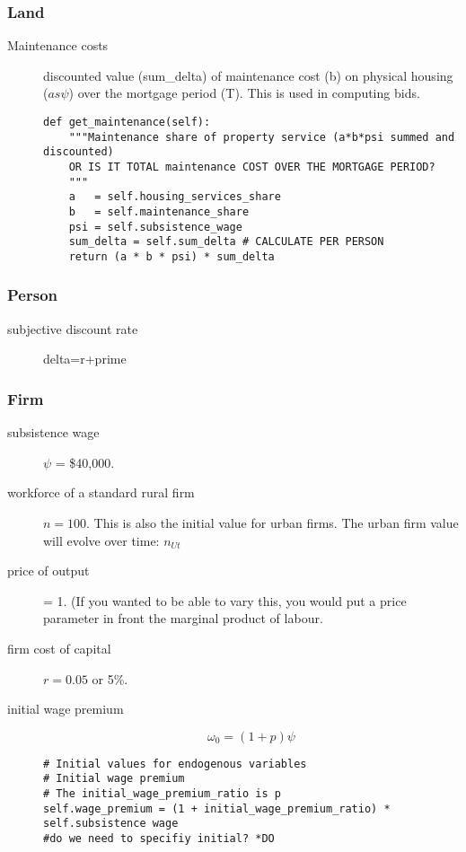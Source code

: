 \subsubsection{Land}
\begin{description}
\item[Maintenance costs] discounted value (sum\_delta) of maintenance cost (b) on  physical housing ($as\psi$) over the mortgage period (T). This is used in computing bids.
\begin{lstlisting}
def get_maintenance(self):
    """Maintenance share of property service (a*b*psi summed and discounted)
    OR IS IT TOTAL maintenance COST OVER THE MORTGAGE PERIOD?
    """
    a   = self.housing_services_share
    b   = self.maintenance_share
    psi = self.subsistence_wage
    sum_delta = self.sum_delta # CALCULATE PER PERSON
    return (a * b * psi) * sum_delta  
\end{lstlisting}
\end{description}

\subsubsection{Person}
\begin{description}
\item[subjective discount rate] delta=r+prime
\end{description}

\subsubsection{Firm}
\begin{description}
\item [subsistence wage] $\psi$ = \$40,000. %

\item [workforce of a standard rural firm] $n=100$. This is also the initial value for urban firms. The urban firm value will evolve over time: $n_{Ut}$ 

\item [price of output] = 1. (If you wanted to be able to vary this, you would put a price parameter in front the %
\gls{marginal product of labour}. %

\item [firm cost of capital] $r = 0.05$ or 5\%.

\item [initial wage premium ]  \[\omega_0=(1+p)\psi\]

\begin{lstlisting}
# Initial values for endogenous variables
# Initial wage premium
# The initial_wage_premium_ratio is p
self.wage_premium = (1 + initial_wage_premium_ratio) * self.subsistence wage
#do we need to specifiy initial? *DO
\end{lstlisting}

\end{description}



